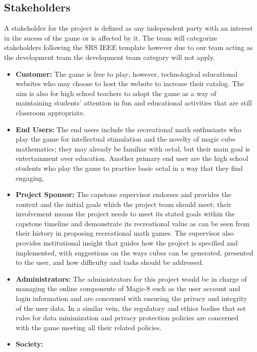 \documentclass[12pt]{article}
\begin{document}
\subsection{Stakeholders}
A stakeholder for the project is defined as any independent party with an interest in the sucess of the game or is affected by it. The team will categorize 
stakeholders following the SRS IEEE template however due to our team acting as the development team the development team category will not apply.

\begin{itemize}
\item \textbf{Customer:}
      The game is free to play; however, technological educational websites who may choose to host the website to increase their catalog. The aim is also for high school teachers to adopt the game as a way of maintaining students' attention
      in fun and educational activities that are still classroom appropriate.
\item \textbf{End Users:} 
      The end users include the recreational math enthusiasts who play the game for intellectual stimulation and the novelty of magic cube mathematics; they may already be familiar with octal, but their main goal is entertainment over education. 
      Another primary end user are the high school students who play the game to practice basic octal in a way that they find engaging.
\item \textbf{Project Sponsor:}
      The capstone supervisor endorses and provides the context and the initial goals which the project team should meet; their involvement means the project needs to meet its stated goals within the capstone timeline
      and demonstrate its recreational value as can be seen from their history in proposing recreational math games. The supervisor also provides institutional insight that guides how the project is specified and implemented, with suggestions
      on the ways cubes can be generated, presented to the user, and how difficulty and tasks should be addressed.
\item \textbf{Administrators:}
      The administrators for this project would be in charge of managing the online components of Magic-8 such as the user account and login information and are concerned with ensuring the privacy and integrity of the user data.
      In a similar vein, the regulatory and ethics bodies that set rules for data minimization and privacy protection policies are concerned with the game meeting all their related policies.
\item \textbf{Society:}

\end{itemize}
\end{document}
